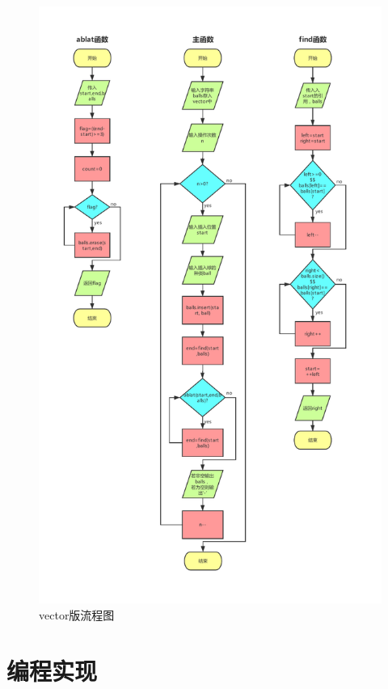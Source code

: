 \documentclass[UTF8]{ctexart}
\begin{document}
\begin{figure}[!htbp] 
	\centering 
	\includegraphics[scale=0.65]{zuma_flowchart.pdf} 
	\caption{vector版流程图} 
	\label{vec_flowchart}
\end{figure}

\newpage

	\section{编程实现}
\end{document}
